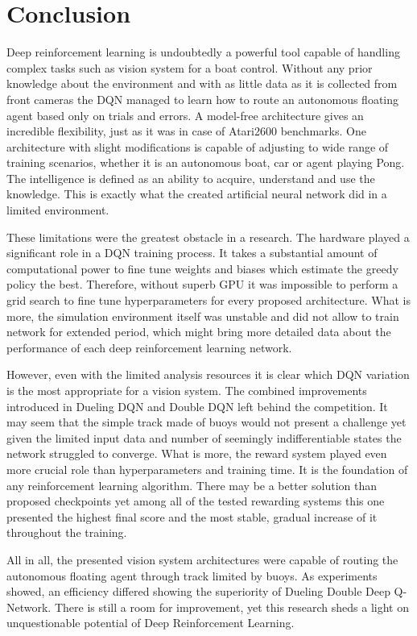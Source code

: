 \chapter{Conclusion}
\label{cha:conclusion}

Deep reinforcement learning is undoubtedly a powerful tool capable of handling complex tasks such as vision system for a boat control.
Without any prior knowledge about the environment and with as little data as it is collected from front cameras the DQN managed to
learn how to route an autonomous floating agent based only on trials and errors. A model-free architecture gives an incredible
flexibility, just as it was in case of Atari2600 benchmarks. One architecture with slight modifications is capable of adjusting to wide
range of training scenarios, whether it is an autonomous boat, car or agent playing Pong. The intelligence is defined as an ability to
acquire, understand and use the knowledge. This is exactly what the created artificial neural network did in a limited environment.

These limitations were the greatest obstacle in a research. The hardware played a significant role in a DQN training process. It takes a
substantial amount of computational power to fine tune weights and biases which estimate the greedy policy the best. Therefore, without
superb GPU it was impossible to perform a grid search to fine tune hyperparameters for every proposed architecture. What is more, the
simulation environment itself was unstable and did not allow to train network for extended period, which might bring more detailed data
about the performance of each deep reinforcement learning network.

However, even with the limited analysis resources it is clear which DQN variation is the most appropriate for a vision system. The
combined improvements introduced in Dueling DQN and Double DQN left behind the competition. It may seem that the simple track made of
buoys would not present a challenge yet given the limited input data and number of seemingly indifferentiable states the network
struggled to converge. What is more, the reward system played even more crucial role than hyperparameters and training time. It is
the foundation of any reinforcement learning algorithm. There may be a better solution than proposed checkpoints yet among all of the
tested rewarding systems this one presented the highest final score and the most stable, gradual increase of it throughout the training.

All in all, the presented vision system architectures were capable of routing the autonomous floating agent through track limited
by buoys. As experiments showed, an efficiency differed showing the superiority of Dueling Double Deep Q-Network. There is still a room for improvement, yet this research sheds a light on unquestionable potential of Deep Reinforcement Learning.